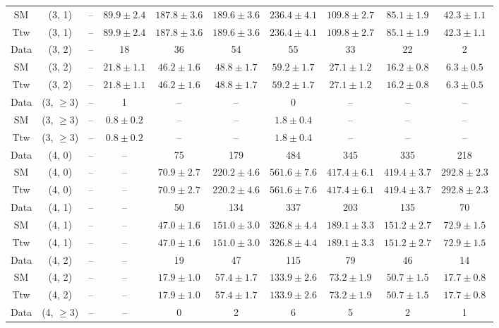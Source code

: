 \begin{table}[h!]
{\begin{tabular}{cccccccccc}
	SM & (3, 1) & -- & $89.9\pm 2.4$ & $187.8\pm 3.6$ & $189.6\pm 3.6$ & $236.4\pm 4.1$ & $109.8\pm 2.7$ & $85.1\pm 1.9$ & $42.3\pm 1.1$ \\[0.5ex] 
	Ttw & (3, 1) & -- & $89.9\pm 2.4$ & $187.8\pm 3.6$ & $189.6\pm 3.6$ & $236.4\pm 4.1$ & $109.8\pm 2.7$ & $85.1\pm 1.9$ & $42.3\pm 1.1$ \\[0.5ex] 
	Data & (3, 2) & -- & 18 & 36 & 54 & 55 & 33 & 22 & 2 \\[0.5ex] 
	SM & (3, 2) & -- & $21.8\pm 1.1$ & $46.2\pm 1.6$ & $48.8\pm 1.7$ & $59.2\pm 1.7$ & $27.1\pm 1.2$ & $16.2\pm 0.8$ & $6.3\pm 0.5$ \\[0.5ex] 
	Ttw & (3, 2) & -- & $21.8\pm 1.1$ & $46.2\pm 1.6$ & $48.8\pm 1.7$ & $59.2\pm 1.7$ & $27.1\pm 1.2$ & $16.2\pm 0.8$ & $6.3\pm 0.5$ \\[0.5ex] 
	Data & (3, $\ge3$) & -- & 1 & -- & -- & 0 & -- & -- & -- \\[0.5ex] 
	SM & (3, $\ge3$) & -- & $0.8\pm 0.2$ & -- & -- & $1.8\pm 0.4$ & -- & -- & -- \\[0.5ex] 
	Ttw & (3, $\ge3$) & -- & $0.8\pm 0.2$ & -- & -- & $1.8\pm 0.4$ & -- & -- & -- \\[0.5ex] 
	Data & (4, 0) & -- & -- & 75 & 179 & 484 & 345 & 335 & 218 \\[0.5ex] 
	SM & (4, 0) & -- & -- & $70.9\pm 2.7$ & $220.2\pm 4.6$ & $561.6\pm 7.6$ & $417.4\pm 6.1$ & $419.4\pm 3.7$ & $292.8\pm 2.3$ \\[0.5ex] 
	Ttw & (4, 0) & -- & -- & $70.9\pm 2.7$ & $220.2\pm 4.6$ & $561.6\pm 7.6$ & $417.4\pm 6.1$ & $419.4\pm 3.7$ & $292.8\pm 2.3$ \\[0.5ex] 
	Data & (4, 1) & -- & -- & 50 & 134 & 337 & 203 & 135 & 70 \\[0.5ex] 
	SM & (4, 1) & -- & -- & $47.0\pm 1.6$ & $151.0\pm 3.0$ & $326.8\pm 4.4$ & $189.1\pm 3.3$ & $151.2\pm 2.7$ & $72.9\pm 1.5$ \\[0.5ex] 
	Ttw & (4, 1) & -- & -- & $47.0\pm 1.6$ & $151.0\pm 3.0$ & $326.8\pm 4.4$ & $189.1\pm 3.3$ & $151.2\pm 2.7$ & $72.9\pm 1.5$ \\[0.5ex] 
	Data & (4, 2) & -- & -- & 19 & 47 & 115 & 79 & 46 & 14 \\[0.5ex] 
	SM & (4, 2) & -- & -- & $17.9\pm 1.0$ & $57.4\pm 1.7$ & $133.9\pm 2.6$ & $73.2\pm 1.9$ & $50.7\pm 1.5$ & $17.7\pm 0.8$ \\[0.5ex] 
	Ttw & (4, 2) & -- & -- & $17.9\pm 1.0$ & $57.4\pm 1.7$ & $133.9\pm 2.6$ & $73.2\pm 1.9$ & $50.7\pm 1.5$ & $17.7\pm 0.8$ \\[0.5ex] 
	Data & (4, $\ge3$) & -- & -- & 0 & 2 & 6 & 5 & 2 & 1 \\[0.5ex] 

\end{tabular}}
\end{table}
